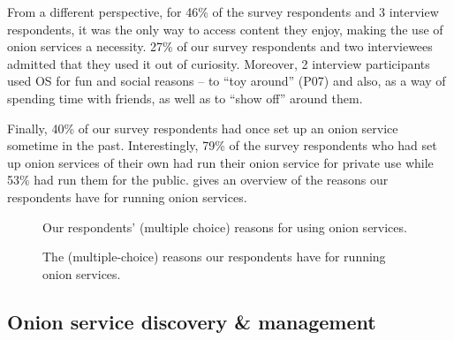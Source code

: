 From a different perspective, for 46\% of the survey respondents and 3 interview respondents, it was the only way to access content they enjoy, making the use of
onion services a necessity. 27\% of our survey respondents and two interviewees admitted that they used it out of
curiosity. Moreover, 2 interview participants used OS for fun and social reasons – to “toy around” (P07) and also, as a way of spending time with friends, as well as to “show off” around them. 
 
Finally, 40\% of our survey respondents had once set up an onion service sometime in the past. 
Interestingly, 79\% of the survey respondents who had set up onion services of their own had run their onion service for
private use while 53\% had run them for the public.  gives an overview of the reasons our
respondents have for running onion services. 


\begin{figure}[t]
    \centering
    
    \caption{Our respondents' (multiple choice) reasons for using onion
    services.}
    \label{fig:onion-usage}
\end{figure}



\begin{figure}[t]
    \centering
    
    \caption{The (multiple-choice) reasons our respondents have for running
    onion services.}
    \label{fig:onion-operation-reasons}
\end{figure}

\subsection{Onion service discovery \& management}
\label{sec:manage}

